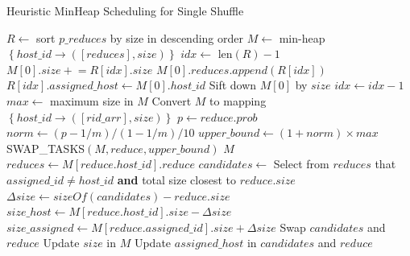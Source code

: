 \begin{minipage}{\columnwidth}
\begin{algorithm}[H]
\caption{Heuristic MinHeap Scheduling for Single Shuffle}
\label{hminheap}
	\begin{algorithmic}[1]
	\small
		\State $R\gets$ sort $p\_reduces$ by size in descending order
		\State $M\gets$ min-heap $\left\{ host\_id \rightarrow \left( \left[ reduces \right], size \right) \right\}$
		\State $idx\gets$ len$\left(R\right) - 1$
		\State $M\left[0\right].size \mathrel{+}= R\left[idx\right].size$
		\State $M\left[0\right].reduces.append\left(R\left[idx\right]\right)$
		\State $R\left[idx\right].assigned\_host \gets M \left[0\right].host\_id$
		\State Sift down $M\left[0\right]$ by $size$
		\State $idx\gets idx-1$
		\EndWhile
		\State $max\gets$ maximum size in $M$
		\State Convert $M$ to mapping $\left\{ host\_id \rightarrow \left( \left[ rid\_arr \right], size \right) \right\}$
				\State $p\gets reduce.prob$
				\State $norm\gets \left(p-1/m\right)/\left(1-1/m\right)/10$
				\State $upper\_bound \gets \left(1 + norm\right) \times max$
				\State SWAP\_TASKS$\left(M, reduce, upper\_bound\right)$
			\EndIf
		\EndFor
		\Return $M$
	\EndProcedure
		\State $reduces \gets M\left[reduce.host\_id\right].reduce$	
		\State $candidates \gets$ Select from $reduces$ that $assigned\_id \neq host\_id$ \textbf{and} total size closest to $reduce.size$
		\State $\Delta size \gets sizeOf\left(candidates\right) - reduce.size$
		\State $size\_host \gets M\left[reduce.host\_id\right].size - \Delta size$
		\State $size\_assigned \gets M\left[reduce.assigned\_id\right].size + \Delta size$
			\State Swap $candidates$ and $reduce$
			\State Update $size$ in $M$
			\State Update $assigned\_host$ in $candidates$ and $reduce$
		\EndIf
	\EndProcedure
	\end{algorithmic}
\end{algorithm}
\end{minipage}


